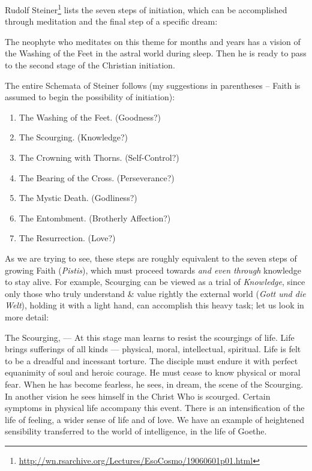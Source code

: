 Rudolf Steiner\footnote{\url{http://wn.rsarchive.org/Lectures/EsoCosmo/19060601p01.html}} lists the seven steps of initiation, which can be accomplished through meditation and the final step of a specific dream:

\begin{quotex}
The neophyte who meditates on this theme for months and years has a vision of the Washing of the Feet in the astral world during sleep. Then he is ready to pass to the second stage of the Christian initiation.
\end{quotex}


The entire Schemata of Steiner follows (my suggestions in parentheses -- Faith is assumed to begin the possibility of initiation):

\begin{enumerate}
\item The Washing of the Feet. (Goodness?)

\item The Scourging. (Knowledge?)

\item The Crowning with Thorns. (Self-Control?)

\item The Bearing of the Cross. (Perseverance?)

\item The Mystic Death. (Godliness?)

\item The Entombment. (Brotherly Affection?)

\item The Resurrection. (Love?)
\end{enumerate}

As we are trying to see, these steps are roughly equivalent to the seven steps of growing Faith (\emph{Pistis}), which must proceed towards \emph{and even through} knowledge to stay alive. For example, Scourging can be viewed as a trial of \emph{Knowledge}, since only those who truly understand \& value rightly the external world (\emph{Gott und die Welt}), holding it with a light hand, can accomplish this heavy task; let us look in more detail:

\begin{quotex}
The Scourging, --- At this stage man learns to resist the scourgings of life. Life brings sufferings of all kinds --- physical, moral, intellectual, spiritual. Life is felt to be a dreadful and incessant torture. The disciple must endure it with perfect equanimity of soul and heroic courage. He must cease to know physical or moral fear. When he has become fearless, he sees, in dream, the scene of the Scourging. In another vision he sees himself in the Christ Who is scourged. Certain symptoms in physical life accompany this event. There is an intensification of the life of feeling, a wider sense of life and of love. We have an example of heightened sensibility transferred to the world of intelligence, in the life of Goethe.
\end{quotex}


